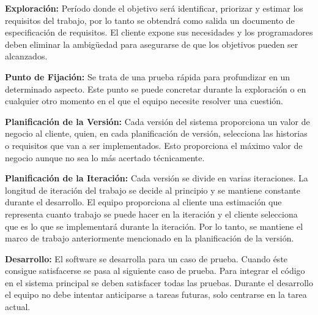 \begin{description}
	\item  \textbf{Exploración:}
	Período donde el objetivo será identificar, priorizar y estimar los requisitos del trabajo, por lo tanto se obtendrá como salida un documento de especificación de requisitos. El cliente expone sus necesidades y los programadores deben eliminar la ambigüedad para asegurarse de que los objetivos pueden ser alcanzados. 
	
	\item \textbf{Punto de Fijación:}
	Se trata de una prueba rápida para profundizar en un determinado aspecto. Este punto se puede concretar durante la exploración o en cualquier otro momento en el que el equipo necesite resolver una cuestión.
	
	\item \textbf{Planificación de la Versión:}
	Cada versión del sistema proporciona un valor de negocio al cliente, quien, en cada planificación de versión, selecciona las historias o requisitos que van a ser implementados. Esto proporciona el máximo valor de negocio aunque no sea lo más acertado técnicamente.
	
	\item \textbf{Planificación de la Iteración:}
	Cada versión se divide en varias iteraciones. La longitud de iteración del trabajo se decide al principio y se mantiene constante durante el desarrollo. El equipo proporciona al cliente una estimación que representa cuanto trabajo se puede hacer en la iteración y el cliente selecciona que es lo que se implementará durante la iteración. Por lo tanto, se mantiene el marco de trabajo anteriormente mencionado en la planificación de la versión.
	
	\item \textbf{Desarrollo:}
	El software se desarrolla para un caso de prueba. Cuando éste consigue satisfacerse se pasa al siguiente caso de prueba. Para integrar el código en el sistema principal se deben satisfacer todas las pruebas. Durante el desarrollo el equipo no debe intentar anticiparse a tareas futuras, solo centrarse en la tarea actual.
	
\end{description}
